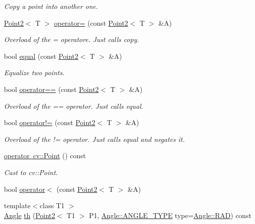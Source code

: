\begin{DoxyCompactItemize}
\begin{DoxyCompactList}\small\item\em Copy a point into another one. \end{DoxyCompactList}\item 
\mbox{\hyperlink{class_point2}{Point2}}$<$ T $>$ \mbox{\hyperlink{class_point2_af715722f2b04def60eb23f291e31c4d8}{operator=}} (const \mbox{\hyperlink{class_point2}{Point2}}$<$ T $>$ \&A)
\begin{DoxyCompactList}\small\item\em Overload of the = operatore. Just calls {\ttfamily copy}. \end{DoxyCompactList}\item 
bool \mbox{\hyperlink{class_point2_a8ecda76875462077d1396319c8a582d5}{equal}} (const \mbox{\hyperlink{class_point2}{Point2}}$<$ T $>$ \&A)
\begin{DoxyCompactList}\small\item\em Equalize two points. \end{DoxyCompactList}\item 
bool \mbox{\hyperlink{class_point2_af58b2b05b59316580b3989b0548afade}{operator==}} (const \mbox{\hyperlink{class_point2}{Point2}}$<$ T $>$ \&A)
\begin{DoxyCompactList}\small\item\em Overload of the == operator. Just calls {\ttfamily equal}. \end{DoxyCompactList}\item 
bool \mbox{\hyperlink{class_point2_ad671e757853f5d7d5431d011d9e94b03}{operator!=}} (const \mbox{\hyperlink{class_point2}{Point2}}$<$ T $>$ \&A)
\begin{DoxyCompactList}\small\item\em Overload of the != operator. Just calls {\ttfamily equal} and negates it. \end{DoxyCompactList}\item 
\mbox{\hyperlink{class_point2_a0d3f17f7d86d02eae126aa329a20861a}{operator cv\+::\+Point}} () const
\begin{DoxyCompactList}\small\item\em Cast to cv\+::\+Point. \end{DoxyCompactList}\item 
bool \mbox{\hyperlink{class_point2_a636a84c47519a482cfce43039e981dff}{operator$<$}} (const \mbox{\hyperlink{class_point2}{Point2}}$<$ T $>$ \&A)
\item 
{\footnotesize template$<$class T1 $>$ }\\\mbox{\hyperlink{class_angle}{Angle}} \mbox{\hyperlink{class_point2_afe4e1b27eb2a47f6f98695d0b715a044}{th}} (\mbox{\hyperlink{class_point2}{Point2}}$<$ T1 $>$ P1, \mbox{\hyperlink{class_angle_a4f7b9849ce8780bcba95ca3ee45cff77}{Angle\+::\+A\+N\+G\+L\+E\+\_\+\+T\+Y\+PE}} type=\mbox{\hyperlink{class_angle_a4f7b9849ce8780bcba95ca3ee45cff77a93ab6b68075fd7a6fe724fbde5b13c1f}{Angle\+::\+R\+AD}}) const

\end{DoxyCompactItemize}
